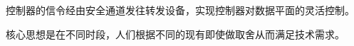 












控制器的信令经由安全通道发往转发设备，实现控制器对数据平面的灵活控制。







核心思想是在不同时段，人们根据不同的现有即使做取舍从而满足技术需求。











































